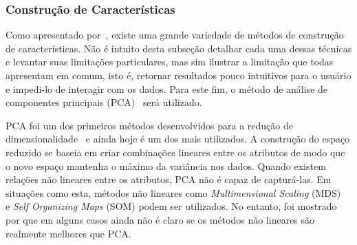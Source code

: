 \subsubsection{Construção de Características}

Como apresentado por~\cite{Maaten2009}, existe uma grande
variedade de métodos de construção de características. Não é
intuito desta subseção detalhar cada uma dessas técnicas e
levantar suas limitações particulares, mas sim ilustrar a
limitação que todas apresentam em comum, isto é, retornar
resultados pouco intuitivos para o usuário e impedi-lo de
interagir com os dados. Para este fim, o método de análise
de componentes principais (PCA)~\cite{Joll2002} será
utilizado.

PCA foi um dos primeiros métodos desenvolvidos para a
redução de dimensionalidade~\cite{Pearson1901} e ainda hoje
é um dos mais utilizados. A construção do espaço reduzido se
baseia em criar combinações lineares entre os atributos de
modo que o novo espaço mantenha o máximo da variância nos
dados. Quando existem relações não lineares entre os
atributos, PCA não é capaz de capturá-las. Em situações como
esta, métodos não lineares como  \textit{Multimensional
Scaling} (MDS)~\cite{Cox2002} e \textit{Self Organizing
Maps} (SOM)\cite{Kohonen1990} podem ser utilizados. No
entanto, foi mostrado por \cite{Maaten2009} que em alguns
casos ainda não é claro se os métodos não lineares são
realmente melhores que PCA.

